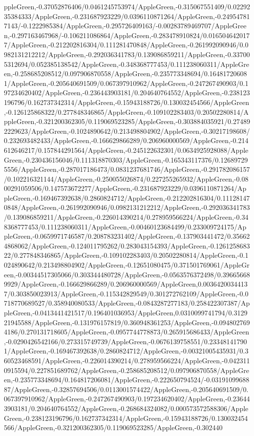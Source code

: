 {\begin{tikzternal}
{ppleGreen,-0.37052876406/0.0461245753974/AppleGreen,-0.315067551409/0.0229235384333/AppleGreen,-0.231687923229/0.0396110871264/AppleGreen,-0.249547817143/-0.1222985384/AppleGreen,-0.295726409163/-0.00283789469707/AppleGreen,-0.297163467968/-0.106211086864/AppleGreen,-0.283478910824/0.0165046420177/AppleGreen,-0.212202816304/0.111281470848/AppleGreen,-0.261992090946/0.0982131212212/AppleGreen,-0.292036341783/0.139086859211/AppleGreen,-0.337005312694/0.052385138542/AppleGreen,-0.348368777453/0.111238060311/AppleGreen,-0.258685208512/0.097906870558/AppleGreen,-0.235773348694/0.164817206081/AppleGreen,-0.205640691509/0.067397910962/AppleGreen,-0.247267490903/0.197234620402/AppleGreen,-0.236443903181/0.204640764552/AppleGreen,-0.238123196796/0.162737342314/AppleGreen,-0.15943188726/0.130032454566/AppleGreen,-0.126125868322/0.277848346865/AppleGreen,-0.109102283403/0.20502280814/AppleGreen,-0.321200362305/0.119069523285/AppleGreen,-0.303884035921/0.274892229623/AppleGreen,-0.1024890642/0.213498804902/AppleGreen,-0.30217198608/0.232693482433/AppleGreen,-0.166629866289/0.206960000569/AppleGreen,-0.214612646217/0.157844291564/AppleGreen,-0.245122632301/0.0634925928088/AppleGreen,-0.230436156046/0.111318870303/AppleGreen,-0.165343117376/0.126897295556/AppleGreen,-0.287017186473/0.0831237681746/AppleGreen,-0.291782086157/0.102216321144/AppleGreen,-0.250055026874/0.227255265932/AppleGreen,-0.0800291059506/0.147573672277/AppleGreen,-0.231687923229/0.0396110871264/AppleGreen,-0.169467392638/0.2860824712/AppleGreen,-0.212202816304/0.111281470848/AppleGreen,-0.261992090946/0.0982131212212/AppleGreen,-0.292036341783/0.139086859211/AppleGreen,-0.226014390214/0.278959566224/AppleGreen,-0.348368777453/0.111238060311/AppleGreen,-0.00460123684499/0.233009724175/AppleGreen,-0.0659971746587/0.208783231402/AppleGreen,-0.137903441472/0.356624868062/AppleGreen,-0.124011795262/0.283043154393/AppleGreen,-0.126125868322/0.277848346865/AppleGreen,-0.109102283403/0.20502280814/AppleGreen,-0.1024890642/0.213498804902/AppleGreen,-0.12651080475/0.371501769061/AppleGreen,-0.00344517305066/0.303344480728/AppleGreen,-0.0563576372498/0.396656689929/AppleGreen,-0.166629866289/0.206960000569/AppleGreen,0.00364200344137/0.303850023913/AppleGreen,-0.115342829549/0.301272762109/AppleGreen,-0.0718770689527/0.358940080533/AppleGreen,-0.0843287277183/0.258422307387/AppleGreen,-0.0413441421517/0.196401036953/AppleGreen,0.0310099741794/0.312921945588/AppleGreen,-0.131976157819/0.360948361253/AppleGreen,-0.0948027694186/0.270131718605/AppleGreen,-0.0957744778873/0.265915686433/AppleGreen,-0.0290426542166/0.273315749739/AppleGreen,-0.0676139758551/0.233481417901/AppleGreen,-0.169467392638/0.2860824712/AppleGreen,-0.00321005435931/0.360523468591/AppleGreen,-0.226014390214/0.278959566224/AppleGreen,-0.0423110915594/0.227851689762/AppleGreen,-0.258685208512/0.097906870558/AppleGreen,-0.235773348694/0.164817206081/AppleGreen,-0.222650794524/-0.0319109968887/AppleGreen,-0.32857694506/0.0113001574422/AppleGreen,-0.205640691509/0.067397910962/AppleGreen,-0.247267490903/0.197234620402/AppleGreen,-0.236443903181/0.204640764552/AppleGreen,-0.268684324082/0.000573572588306/AppleGreen,-0.238123196796/0.162737342314/AppleGreen,-0.15943188726/0.130032454566/AppleGreen,-0.321200362305/0.119069523285/AppleGreen,-0.302440}
\end{tikzternal}}
